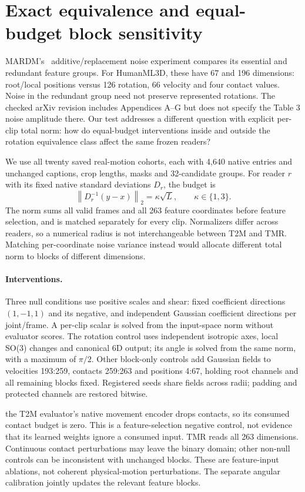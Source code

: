 \documentclass[10pt,twocolumn,letterpaper]{article}
\begin{document}
\section{Exact equivalence and equal-budget block sensitivity}
MARDM's~\cite{mardm2025} additive/replacement noise experiment compares its essential and redundant feature groups. For HumanML3D, these have 67 and 196 dimensions: root/local positions versus 126 rotation, 66 velocity and four contact values. Noise in the redundant group need not preserve represented rotations. The checked arXiv revision includes Appendices A--G but does not specify the Table 3 noise amplitude there. Our test addresses a different question with explicit per-clip total norm: how do equal-budget interventions inside and outside the rotation equivalence class affect the same frozen readers?

We use all twenty saved real-motion cohorts, each with 4,640 native entries and unchanged captions, crop lengths, masks and 32-candidate groups. For reader $r$ with its fixed native standard deviations $D_r$, the budget is
\begin{equation}
\left\|D_r^{-1}(y-x)\right\|_2=\kappa\sqrt L,\qquad\kappa\in\{1,3\}.
\end{equation}
The norm sums all valid frames and all 263 feature coordinates before feature selection, and is matched separately for every clip. Normalizers differ across readers, so a numerical radius is not interchangeable between T2M and TMR. Matching per-coordinate noise variance instead would allocate different total norm to blocks of different dimensions.

\paragraph{Interventions.}
Three null conditions use positive scales and shear: fixed coefficient directions $(1,-1,1)$ and its negative, and independent Gaussian coefficient directions per joint/frame. A per-clip scalar is solved from the input-space norm without evaluator scores. The rotation control uses independent isotropic axes, local SO(3) changes and canonical 6D output; its angle is solved from the same norm, with a maximum of $\pi/2$. Other block-only controls add Gaussian fields to velocities 193:259, contacts 259:263 and positions 4:67, holding root channels and all remaining blocks fixed. Registered seeds share fields across radii; padding and protected channels are restored bitwise.

the T2M evaluator's native movement encoder drops contacts, so its consumed contact budget is zero. This is a feature-selection negative control, not evidence that its learned weights ignore a consumed input. TMR reads all 263 dimensions. Continuous contact perturbations may leave the binary domain; other non-null controls can be inconsistent with unchanged blocks. These are feature-input ablations, not coherent physical-motion perturbations. The separate angular calibration jointly updates the relevant feature blocks.
\end{document}
